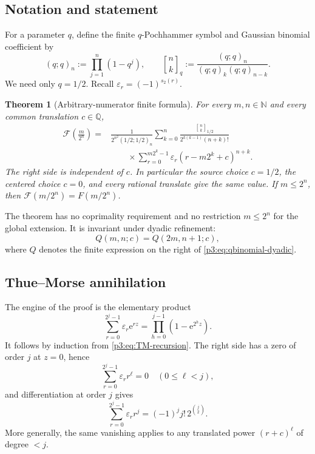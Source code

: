 \documentclass[11pt]{article}
\numberwithin{equation}{section}
\newtheorem{theorem}{Theorem}[section]
\theoremstyle{definition}
\theoremstyle{remark}
\newcommand{\Q}{\mathbb Q}
\newcommand{\N}{\mathbb N}
\newcommand{\GF}{\mathcal F}
\newcommand{\eps}{\varepsilon}
\newcommand{\e}{\mathrm e}
\newcommand{\GaussBinom}[3]{\genfrac{[}{]}{0pt}{}{#1}{#2}_{#3}}
\begin{document}
\subsection{Notation and statement}

For a parameter $q$, define the finite $q$-Pochhammer symbol and Gaussian binomial coefficient by
\begin{equation}\label{p3:eq:q-notation}
 (q;q)_n:=\prod_{j=1}^{n}(1-q^j),
 \qquad
 \GaussBinom{n}{k}{q}:=\frac{(q;q)_n}{(q;q)_k(q;q)_{n-k}}.
\end{equation}
We need only $q=1/2$.  Recall $\eps_r=(-1)^{s_2(r)}$.

\begin{theorem}[Arbitrary-numerator finite formula]\label{p3:thm:qbinomial-dyadic}
For every $m,n\in\N$ and every common translation $c\in\Q$,
\begin{equation}\label{p3:eq:qbinomial-dyadic}
\boxed{
\begin{aligned}
 \GF\!\left(\frac{m}{2^n}\right)
 ={}&\frac{1}{2^{n^2}(1/2;1/2)_n}
 \sum_{k=0}^{n}
 \frac{\GaussBinom{n}{k}{1/2}}
      {2^{k(k-1)}(n+k)!}\\
 &\qquad\times
 \sum_{r=0}^{m2^k-1}\eps_r
 \left(r-m2^k+c\right)^{n+k}.
\end{aligned}}
\end{equation}
The right side is independent of $c$.  In particular the source choice $c=1/2$, the centered choice $c=0$, and every rational translate give the same value.  If $m\le2^n$, then $\GF(m/2^n)=F(m/2^n)$.
\end{theorem}

The theorem has no coprimality requirement and no restriction $m\le2^n$ for the global extension.  It is invariant under dyadic refinement:
\begin{equation}\label{p3:eq:q-refinement-invariance}
 Q(m,n;c)=Q(2m,n+1;c),
\end{equation}
where $Q$ denotes the finite expression on the right of \eqref{p3:eq:qbinomial-dyadic}.

\subsection{Thue--Morse annihilation}

The engine of the proof is the elementary product
\begin{equation}\label{p3:eq:TM-exponential-product}
 \sum_{r=0}^{2^j-1}\eps_r\e^{rz}
 =\prod_{h=0}^{j-1}(1-\e^{2^h z}).
\end{equation}
It follows by induction from \eqref{p3:eq:TM-recursion}.  The right side has a zero of order $j$ at $z=0$, hence
\begin{equation}\label{p3:eq:TM-power-annihilation}
 \sum_{r=0}^{2^j-1}\eps_r r^\ell=0
 \quad(0\le\ell<j),
\end{equation}
and differentiation at order $j$ gives
\begin{equation}\label{p3:eq:TM-leading-power}
 \sum_{r=0}^{2^j-1}\eps_r r^j
 =(-1)^j j!\,2^{\binom j2}.
\end{equation}
More generally, the same vanishing applies to any translated power $(r+c)^\ell$ of degree $<j$.
\end{document}
